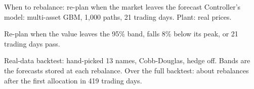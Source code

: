 \begin{frame}{When to rebalance: re-plan when the market leaves the forecast}
  \begingroup\footnotesize\color{vnslidebody}
  Controller's model: multi-asset GBM, 1,000 paths, 21 trading days. Plant: real prices.\par
  Re-plan when the value leaves the 95\% band, falls 8\% below its peak, or 21 trading days pass.\par
  \endgroup
  \vspace{2pt}
  \vnmpcfigure{11.4cm}{2.85cm}\par
  \vfill
  {\scriptsize Real-data backtest: hand-picked 13 names, Cobb-Douglas, hedge off. Bands are the forecasts stored at
    each rebalance. Over the full backtest: about \Rebalances{} rebalances after the first allocation in 419 trading
    days.\par}
\end{frame}
